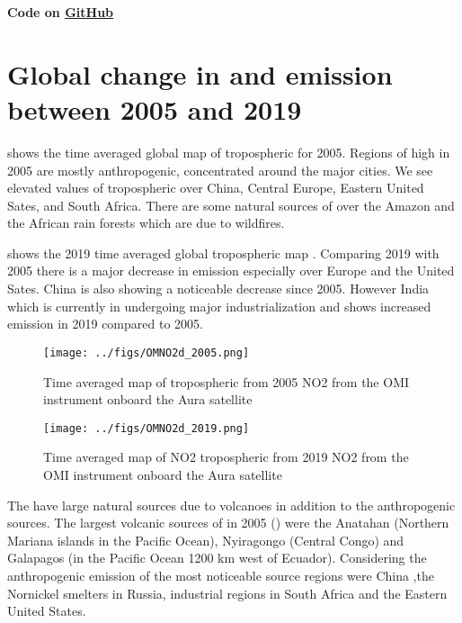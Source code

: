 
\textbf{Code on \href{https://github.com/Ovewh/ATM325/tree/master/Exercise6}{GitHub}}

\section*{Global change in  and  emission between 2005 and 2019} 
 shows the time averaged global map of tropospheric 
 for 2005. Regions of high  in 2005 are mostly
anthropogenic, concentrated around the major cities. We see elevated values of tropospheric  over 
China, Central Europe, Eastern United Sates, and South Africa. There 
are some natural sources of  over the Amazon and the African rain forests which are due 
to wildfires.  

 shows the 2019 time averaged global tropospheric
map  . Comparing 2019 with 2005 there is a major 
decrease in  emission especially over Europe and the United Sates. China is also 
showing a noticeable decrease since 2005. However India which is currently in undergoing 
major industrialization and shows increased  emission in 2019 compared to 2005. 

\begin{figure}[htbp]
    \centering
        \texttt{[image: ../figs/OMNO2d\_2005.png]}
    \caption{Time averaged map of  tropospheric from 2005 NO2 from the OMI instrument
    onboard the Aura satellite   }
    \label{fig:OMI_global_2005NO2}
\end{figure}

\begin{figure}[htpb]
    \centering
        \texttt{[image: ../figs/OMNO2d\_2019.png]}
    \caption{Time averaged map of NO2 tropospheric from 2019 NO2 from the OMI instrument  
    onboard the Aura satellite}
    \label{fig:OMI_global_2019NO2}
\end{figure}

The  have large natural sources due to volcanoes in addition to the
anthropogenic sources. The largest volcanic sources of  
in 2005 () were the Anatahan (Northern Mariana 
islands in the Pacific Ocean), Nyiragongo (Central Congo) and Galapagos 
(in the Pacific Ocean 1200 km west of Ecuador). Considering the anthropogenic 
emission of  the most noticeable source regions were China 
,the Nornickel smelters in Russia, industrial regions in South Africa and 
the Eastern United States.   

